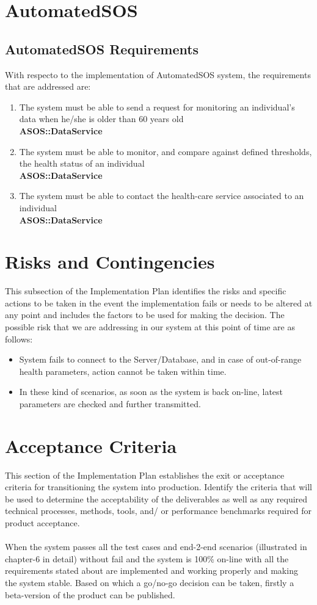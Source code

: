 \documentclass[a4paper, hidelinks, 12pt]{report}
\newcommand\requirement[1]{\item[{[R#1]}] }
\begin{document}
\section{\textbf{AutomatedSOS}}
\subsection{AutomatedSOS Requirements}
	With respecto to the implementation of AutomatedSOS system, the requirements that are addressed are:
	\begin{enumerate}
		\requirement{13} The system must be able to send a request for monitoring an individual's data when he/she is older than 60 years old \\
		\textbf{ASOS::DataService}
		\requirement{14} The system must be able to monitor, and compare against defined thresholds, the health status of an individual \\
		\textbf{ASOS::DataService}
		\requirement{15} The system must be able to contact the health-care service associated to an individual \\
		\textbf{ASOS::DataService}
	\end{enumerate}

\section{Risks and Contingencies}
This subsection of the Implementation Plan identifies the risks and specific actions to be taken in the event the implementation fails or needs to be altered at any point and includes the factors to be used for making the decision. The possible risk that we are addressing in our system at this point of time are as follows:
\begin{itemize}
\item{} System fails to connect to the Server/Database, and in case of out-of-range health parameters, action cannot be taken within time. 
\item{} In these kind of scenarios, as soon as the system is back on-line, latest parameters are checked and further transmitted.
\end{itemize}

\section{Acceptance Criteria}
This section of the Implementation Plan establishes the exit or acceptance criteria for transitioning the system into production. Identify the criteria that will be used to determine the acceptability of the deliverables as well as any required technical processes, methods, tools, and/ or performance benchmarks required for product acceptance. \\\\
When the system passes all the test cases and end-2-end scenarios (illustrated in chapter-6 in detail) without fail and the system is 100\% on-line with all the requirements stated about are implemented and working properly and making the system stable. Based on which a go/no-go decision can be taken, firstly a beta-version of the product can be published.
	
\end{document}
